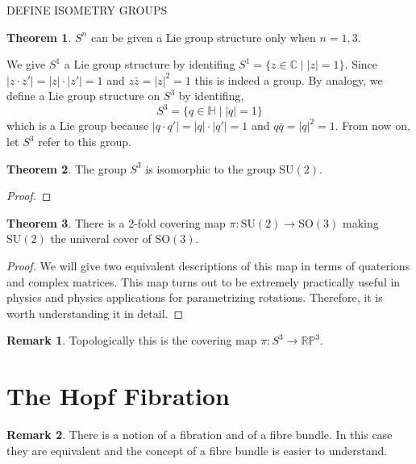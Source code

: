 \documentclass[12pt]{extarticle}
\theoremstyle{definition}
\newtheorem{theorem}{Theorem}[section]
\newtheorem{remark}{Remark}
\newenvironment{definition}[1][Definition:]{\begin{trivlist}
\item[\hskip \labelsep {\bfseries #1}]}{\end{trivlist}}
\newcommand{\SO}[1]{\mathrm{SO}\left(#1\right)}
\newcommand{\SU}[1]{\mathrm{SU}\left(#1\right)}
\newcommand{\C}{\mathbb{C}}
\renewcommand{\H}{\mathbb{H}}
\begin{document}
DEFINE ISOMETRY GROUPS

\begin{theorem}
$S^n$ can be given a Lie group structure only when $n = 1,3$. 
\end{theorem}

\begin{definition}
We give $S^1$ a Lie group structure by identifing $S^1 = \{ z \in \C \mid |z| = 1 \}$. Since $|z \cdot z'| = |z| \cdot |z'| = 1$ and $z \bar{z} = |z|^2 = 1$ this is indeed a group. By analogy, we define a Lie group structure on $S^3$ by identifing,
\[ S^3 = \{ q \in \H \mid |q| = 1 \} \]
which is a Lie group because $|q \cdot q'| = |q| \cdot |q'| = 1$ and $q \bar{q} = |q|^2 = 1$. From now on, let $S^3$ refer to this group. 
\end{definition}

\begin{theorem}
The group $S^3$ is isomorphic to the group $\SU{2}$. 
\end{theorem}

\begin{proof}

\end{proof}


\begin{theorem}
There is a 2-fold covering map $\pi : \SU{2} \to \SO{3}$ making $\SU{2}$ the univeral cover of $\SO{3}$. 
\end{theorem}

\begin{proof}
We will give two equivalent descriptions of this map in terms of quaterions and complex matrices. This map turns out to be extremely practically useful in physics and physics applications for parametrizing rotations. Therefore, it is worth understanding it in detail.
\end{proof}

\begin{remark}
Topologically this is the covering map $\pi : S^3 \to \mathbb{RP}^3$. 
\end{remark}



\section{The Hopf Fibration}

\begin{remark}
There is a notion of a fibration and of a fibre bundle. In this case they are equivalent and the concept of a fibre bundle is easier to understand.
\end{remark}
\end{document}
